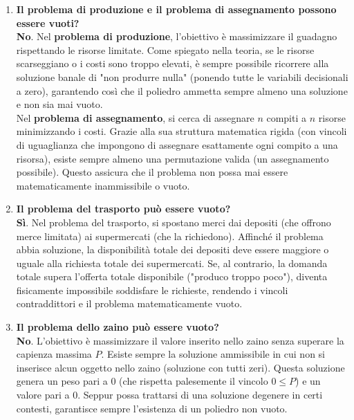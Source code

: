 \documentclass[12pt, a4paper]{article}
\begin{document}
	\begin{enumerate}
		\item \textbf{Il problema di produzione e il problema di assegnamento possono essere vuoti?}\\
		\textbf{No}. 
		Nel \textbf{problema di produzione}, l'obiettivo è massimizzare il guadagno rispettando le risorse limitate. Come spiegato nella teoria, se le risorse scarseggiano o i costi sono troppo elevati, è sempre possibile ricorrere alla soluzione banale di "non produrre nulla" (ponendo tutte le variabili decisionali a zero), garantendo così che il poliedro ammetta sempre almeno una soluzione e non sia mai vuoto.\\
		Nel \textbf{problema di assegnamento}, si cerca di assegnare $n$ compiti a $n$ risorse minimizzando i costi. Grazie alla sua struttura matematica rigida (con vincoli di uguaglianza che impongono di assegnare esattamente ogni compito a una risorsa), esiste sempre almeno una permutazione valida (un assegnamento possibile). Questo assicura che il problema non possa mai essere matematicamente inammissibile o vuoto.
		
		\item \textbf{Il problema del trasporto può essere vuoto?}\\
		\textbf{Sì}. 
		Nel problema del trasporto, si spostano merci dai depositi (che offrono merce limitata) ai supermercati (che la richiedono). Affinché il problema abbia soluzione, la disponibilità totale dei depositi deve essere maggiore o uguale alla richiesta totale dei supermercati. Se, al contrario, la domanda totale supera l'offerta totale disponibile ("produco troppo poco"), diventa fisicamente impossibile soddisfare le richieste, rendendo i vincoli contraddittori e il problema matematicamente vuoto.
		
		\item \textbf{Il problema dello zaino può essere vuoto?}\\
		\textbf{No}. 
		L'obiettivo è massimizzare il valore inserito nello zaino senza superare la capienza massima $P$. Esiste sempre la soluzione ammissibile in cui non si inserisce alcun oggetto nello zaino (soluzione con tutti zeri). Questa soluzione genera un peso pari a $0$ (che rispetta palesemente il vincolo $0 \le P$) e un valore pari a $0$. Seppur possa trattarsi di una soluzione degenere in certi contesti, garantisce sempre l'esistenza di un poliedro non vuoto.
		

\end{enumerate}
\end{document}
